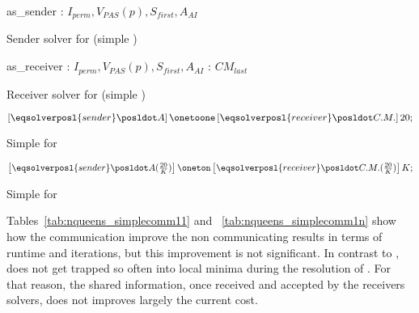 \begin{algorithm}[H]
\dontprintsemicolon
\SetNoline
{}
   as\_sender\;
\algoindent {} : $I_{perm}, V_{PAS}(p), S_{first}, A_{AI}$ \;
\caption{Sender solver for \NQP{} (simple \commstr)}\label{as:nq_sender}
\end{algorithm}

\begin{algorithm}[H]
\dontprintsemicolon
\SetNoline
{}
   as\_receiver\;
\algoindent {} : $I_{perm}, V_{PAS}(p), S_{first}, A_{AI}$ \;
\algoindent {}: $CM_{last}$\;
\caption{Receiver solver for \NQP{} (simple \commstr)}\label{as:nq_receiver}
\end{algorithm}

\begin{algorithm}[H]
\dontprintsemicolon
\SetNoline
$\left[\eqsolverposl{sender}\posldot A\right] \onetoone \left[\eqsolverposl{receiver}\posldot C.M.\right]20;$
\caption{Simple \commstr{} \oneTone{} for \NQP}\label{comm:nqueens_simple_11}
\end{algorithm}

\begin{algorithm}[H]
\dontprintsemicolon
\SetNoline
$\left[\eqsolverposl{sender}\posldot A(\tfrac{20}{K})\right] \oneton \left[\eqsolverposl{receiver}\posldot C.M.(\tfrac{20}{K})\right]K;$
\caption{Simple \commstr{} \oneTn{} for \NQP}\label{comm:nqueens_simple_1nk}
\end{algorithm}

Tables~\ref{tab:nqueens_simplecomm11} and ~\ref{tab:nqueens_simplecomm1n} show how the communication improve the non communicating results in terms of runtime and iterations, but this improvement is not significant. In contrast to \SGP, \posl{} does not get trapped so often into local minima during the resolution of \NQP{}. For that reason, the shared information, once received and accepted by the receivers solvers, does not improves largely the current cost.

